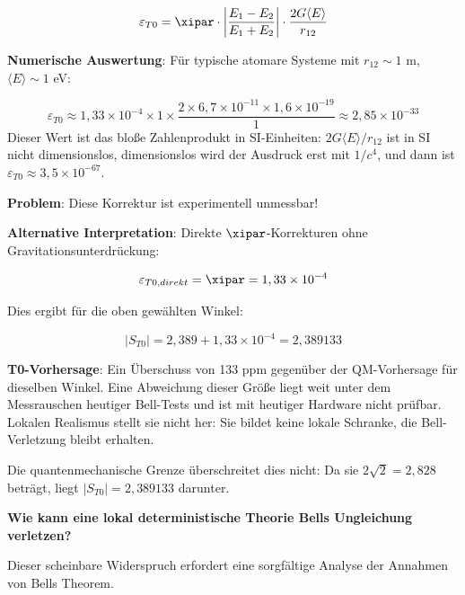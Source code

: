 	\begin{equation}
		\varepsilon_{T0} = \xipar \cdot \left|\frac{E_1 - E_2}{E_1 + E_2}\right| \cdot \frac{2G\langle E \rangle}{r_{12}}
	\end{equation}
	
	\textbf{Numerische Auswertung}: Für typische atomare Systeme mit $r_{12} \sim 1$ m, $\langle E \rangle \sim 1$ eV:
	
	\begin{equation}
		\varepsilon_{T0} \approx 1,33 \times 10^{-4} \times 1 \times \frac{2 \times 6,7 \times 10^{-11} \times 1,6 \times 10^{-19}}{1} \approx 2,85 \times 10^{-33}
	\end{equation}
	Dieser Wert ist das bloße Zahlenprodukt in SI-Einheiten: $2G\langle E\rangle/r_{12}$ ist in SI nicht dimensionslos, dimensionslos wird der Ausdruck erst mit $1/c^4$, und dann ist $\varepsilon_{T0} \approx 3,5\times10^{-67}$.
	
	\textbf{Problem}: Diese Korrektur ist experimentell unmessbar!
	
	\textbf{Alternative Interpretation}: Direkte $\xipar$-Korrekturen ohne Gravitationsunterdrückung:
	
	\begin{equation}
		\varepsilon_{T0,direkt} = \xipar = 1,33 \times 10^{-4}
	\end{equation}
	
	Dies ergibt für die oben gewählten Winkel:
	
	\begin{equation}
		|S_{T0}| = 2,389 + 1,33 \times 10^{-4} = 2,389133
	\end{equation}
	
	\textbf{T0-Vorhersage}: Ein Überschuss von 133 ppm gegenüber der QM-Vorhersage für dieselben Winkel. Eine Abweichung dieser Größe liegt weit unter dem Messrauschen heutiger Bell-Tests und ist mit heutiger Hardware nicht prüfbar. Lokalen Realismus stellt sie nicht her: Sie bildet keine lokale Schranke, die Bell-Verletzung bleibt erhalten.
	
	Die quantenmechanische Grenze überschreitet dies nicht: Da sie $2\sqrt2 = 2,828$ beträgt, liegt $|S_{T0}| = 2,389133$ darunter.
	
	\begin{tcolorbox}[colback=yellow!5!white,colframe=orange!75!black,title=Kritische Frage]
		\textbf{Wie kann eine lokal deterministische Theorie Bells Ungleichung verletzen?}
		
		Dieser scheinbare Widerspruch erfordert eine sorgfältige Analyse der Annahmen von Bells Theorem.
	\end{tcolorbox}
	
